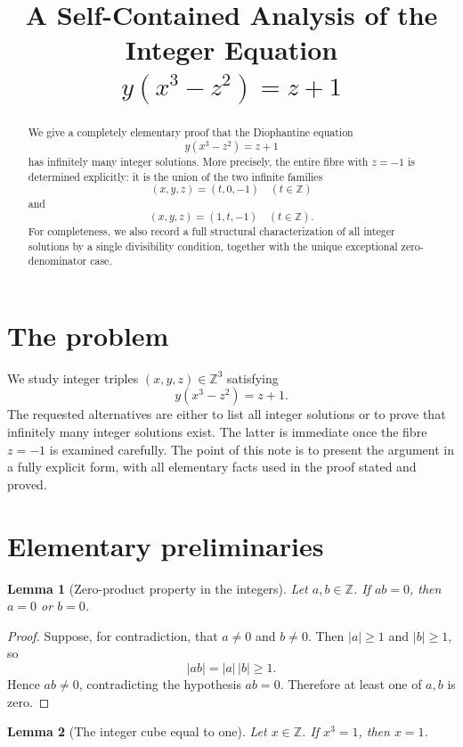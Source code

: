 \documentclass[11pt]{article}
\title{A Self-Contained Analysis of the Integer Equation\\[0.3em]
\large \texorpdfstring{$y(x^3-z^2)=z+1$}{y(x^3-z^2)=z+1}}
\author{}
\date{}
\newtheorem{lemma}{Lemma}
\theoremstyle{remark}
\newcommand{\Z}{\mathbb{Z}}
\begin{document}
\maketitle

\begin{abstract}
We give a completely elementary proof that the Diophantine equation
\[
        y(x^3-z^2)=z+1
\]
has infinitely many integer solutions.  More precisely, the entire fibre with
$z=-1$ is determined explicitly: it is the union of the two infinite families
\[
        (x,y,z)=(t,0,-1) \quad (t\in\Z)
\]
and
\[
        (x,y,z)=(1,t,-1) \quad (t\in\Z).
\]
For completeness, we also record a full structural characterization of all
integer solutions by a single divisibility condition, together with the unique
exceptional zero-denominator case.
\end{abstract}

\section{The problem}

We study integer triples $(x,y,z)\in\Z^3$ satisfying
\begin{equation}\label{eq:main}
        y(x^3-z^2)=z+1.
\end{equation}
The requested alternatives are either to list all integer solutions or to prove
that infinitely many integer solutions exist.  The latter is immediate once the
fibre $z=-1$ is examined carefully.  The point of this note is to present the
argument in a fully explicit form, with all elementary facts used in the proof
stated and proved.

\section{Elementary preliminaries}

\begin{lemma}[Zero-product property in the integers]\label{lem:zpp}
Let $a,b\in\Z$.  If $ab=0$, then $a=0$ or $b=0$.
\end{lemma}

\begin{proof}
Suppose, for contradiction, that $a\ne 0$ and $b\ne 0$.  Then
$|a|\ge 1$ and $|b|\ge 1$, so
\[
        |ab|=|a|\,|b|\ge 1.
\]
Hence $ab\ne 0$, contradicting the hypothesis $ab=0$.  Therefore at least one
of $a,b$ is zero.
\end{proof}

\begin{lemma}[The integer cube equal to one]\label{lem:cubeone}
Let $x\in\Z$.  If $x^3=1$, then $x=1$.
\end{lemma}
\end{document}
